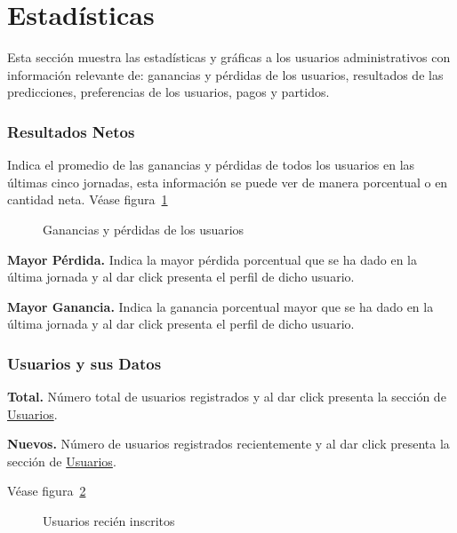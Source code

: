 \section{Estadísticas}

Esta sección muestra las estadísticas y gráficas a los usuarios administrativos con información relevante de: ganancias y pérdidas de los usuarios, resultados de las predicciones, preferencias de los usuarios, pagos y partidos.

\subsubsection{Resultados Netos}

Indica el promedio de las ganancias y pérdidas de todos los usuarios en las últimas cinco jornadas, esta información se puede ver de manera porcentual o en cantidad neta.
Véase figura~\ref{Fig:mayor-ganancia}
\begin{figure}[!htb]\centering
   \begin {minipage}{0.4\textwidth}
     \caption{Ganancias y pérdidas de los usuarios}
	 \label{Fig:mayor-ganancia}
   \end{minipage}
\end{figure}


\textbf{Mayor Pérdida.}
Indica la mayor pérdida porcentual que se ha dado en la última jornada y al dar click presenta el perfil de dicho usuario.

\textbf{Mayor Ganancia.}
Indica la ganancia porcentual mayor que se ha dado en la última jornada y al dar click presenta el perfil de dicho usuario.


\subsubsection{Usuarios y sus Datos}

\textbf{Total.} Número total de usuarios registrados y al dar click presenta la sección de \underline{Usuarios}.

\textbf{Nuevos.} Número de usuarios registrados recientemente y al dar click presenta la sección de \underline{Usuarios}.

Véase figura~\ref{Fig:nuevos-usuarios}
\begin{figure}[!htb]\centering
   \begin {minipage}{0.4\textwidth}
     \caption{Usuarios recién inscritos}
	 \label{Fig:nuevos-usuarios}
   \end{minipage}
\end{figure}

